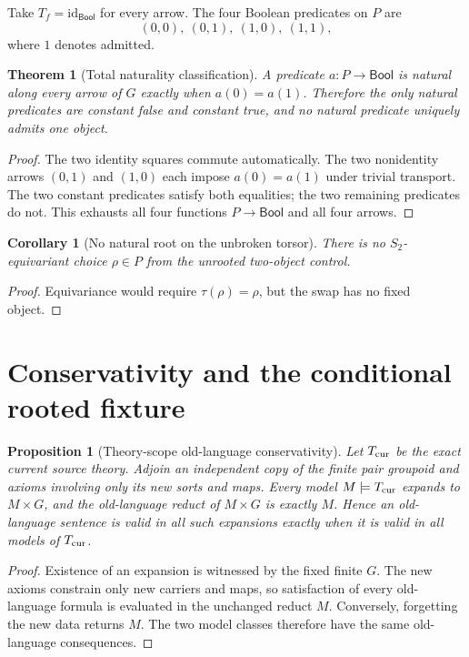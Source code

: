 \documentclass[11pt]{article}
\newtheorem{theorem}{Theorem}
\newtheorem{proposition}{Proposition}
\newtheorem{corollary}{Corollary}
\newcommand{\Bool}{\mathsf{Bool}}
\begin{document}
Take $T_f=\mathrm{id}_{\Bool}$ for every arrow.  The four Boolean predicates
on $P$ are
\[
 (0,0),\ (0,1),\ (1,0),\ (1,1),
\]
where $1$ denotes admitted.

\begin{theorem}[Total naturality classification]
A predicate $a:P\to\Bool$ is natural along every arrow of $G$ exactly when
$a(0)=a(1)$.  Therefore the only natural predicates are constant false and
constant true, and no natural predicate uniquely admits one object.
\end{theorem}

\begin{proof}
The two identity squares commute automatically.  The two nonidentity arrows
$(0,1)$ and $(1,0)$ each impose $a(0)=a(1)$ under trivial transport.  The two
constant predicates satisfy both equalities; the two remaining predicates do
not.  This exhausts all four functions $P\to\Bool$ and all four arrows.
\end{proof}

\begin{corollary}[No natural root on the unbroken torsor]
There is no $S_2$-equivariant choice $\rho\in P$ from the unrooted
two-object control.
\end{corollary}

\begin{proof}
Equivariance would require $\tau(\rho)=\rho$, but the swap has no fixed
object.
\end{proof}

\section{Conservativity and the conditional rooted fixture}

\begin{proposition}[Theory-scope old-language conservativity]
Let $T_{\rm cur}$ be the exact current source theory.  Adjoin an independent
copy of the finite pair groupoid and axioms involving only its new sorts and
maps.  Every model $M\models T_{\rm cur}$ expands to $M\times G$, and the
old-language reduct of $M\times G$ is exactly $M$.  Hence an old-language
sentence is valid in all such expansions exactly when it is valid in all
models of $T_{\rm cur}$.
\end{proposition}

\begin{proof}
Existence of an expansion is witnessed by the fixed finite $G$.  The new
axioms constrain only new carriers and maps, so satisfaction of every
old-language formula is evaluated in the unchanged reduct $M$.  Conversely,
forgetting the new data returns $M$.  The two model classes therefore have
the same old-language consequences.
\end{proof}
\end{document}

